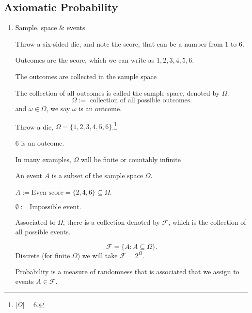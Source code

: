 \documentclass[10pt, a4paper]{article}
\begin{document}
\subsection{Axiomatic Probability}
\begin{enumerate}[label = (\roman*)]
    \item Sample, space \& events

    Throw a  six-sided die, and note the score, that can be a number from $1$ to $6$.

    Outcomes are the score, which we can write as $1, 2, 3, 4, 5, 6$.

    The outcomes are collected in the sample space
    \begin{definition}
        The collection of all outcomes is called the sample space, denoted by $\Omega$.
        \[
        \Omega := \text{ collection of all possible outcomes}.
        \]
        and $\omega \in \Omega$, we say $\omega$ is an outcome.
    \end{definition}
    \begin{example}\phantom{}
    
        Throw a die, $\Omega = \{1, 2, 3, 4, 5, 6\}$.\footnote{$|\Omega| = 6$.}

        $6$ is an outcome.
    \end{example}

    In many examples, $\Omega$ will be finite or countably infinite

    \begin{definition}[Event]
        An event $A$ is a subset of the sample space $\Omega$.
    \end{definition}
    \begin{example} \phantom{}
    
        $A := \text{Even score} = \{2, 4, 6\} \subseteq \Omega$.

        $\emptyset := \text{Impossible event}.$ 
    \end{example}

    \begin{definition}[Probability]
        Associated to $\Omega$, there is a collection denoted by $\mathcal{F}$, which is the collection of all possible events.

        \[
        \mathcal{F} = \{A : A \subseteq \Omega\}.
        \]
        Discrete (for finite $\Omega$) we will take $\mathcal{F} = 2 ^ \Omega$.

        Probability is a measure of randomness that is associated that we assign to events $A \in \mathcal{F}$.
    \end{definition}
\end{enumerate}
\end{document}
